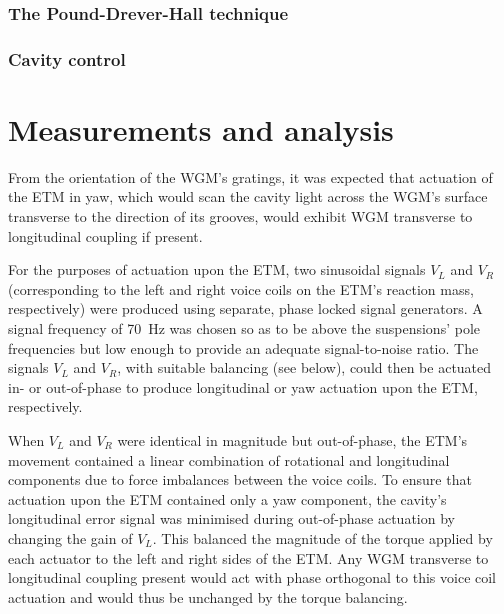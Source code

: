 \subsubsection{The Pound-Drever-Hall technique}

\subsubsection{Cavity control}

\section{Measurements and analysis}
\label{sec:measurements}

From the orientation of the \gls{WGM}'s gratings, it was expected that actuation of the \gls{ETM} in yaw, which would scan the cavity light across the \gls{WGM}'s surface transverse to the direction of its grooves, would exhibit \gls{WGM} transverse to longitudinal coupling if present.

For the purposes of actuation upon the \gls{ETM}, two sinusoidal signals $V_L$ and $V_R$ (corresponding to the left and right voice coils on the \gls{ETM}'s reaction mass, respectively) were produced using separate, phase locked signal generators. A signal frequency of \SI{70}{\hertz} was chosen so as to be above the suspensions' pole frequencies but low enough to provide an adequate signal-to-noise ratio. The signals $V_L$ and $V_R$, with suitable balancing (see below), could then be actuated in- or out-of-phase to produce longitudinal or yaw actuation upon the \gls{ETM}, respectively.

When $V_L$ and $V_R$ were identical in magnitude but out-of-phase, the \gls{ETM}'s movement contained a linear combination of rotational and longitudinal components due to force imbalances between the voice coils. To ensure that actuation upon the \gls{ETM} contained only a yaw component, the cavity's longitudinal error signal was minimised during out-of-phase actuation by changing the gain of $V_L$. This balanced the magnitude of the torque applied by each actuator to the left and right sides of the \gls{ETM}. Any \gls{WGM} transverse to longitudinal coupling present would act with phase orthogonal to this voice coil actuation and would thus be unchanged by the torque balancing.

